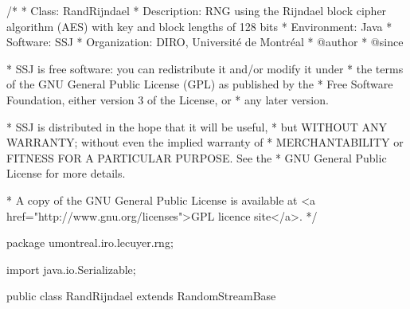 \begin{code}
\begin{hide}
/*
 * Class:        RandRijndael
 * Description:  RNG using the Rijndael block cipher algorithm (AES) with
                 key and block lengths of 128 bits
 * Environment:  Java
 * Software:     SSJ 
 * Organization: DIRO, Université de Montréal
 * @author       
 * @since

 * SSJ is free software: you can redistribute it and/or modify it under
 * the terms of the GNU General Public License (GPL) as published by the
 * Free Software Foundation, either version 3 of the License, or
 * any later version.

 * SSJ is distributed in the hope that it will be useful,
 * but WITHOUT ANY WARRANTY; without even the implied warranty of
 * MERCHANTABILITY or FITNESS FOR A PARTICULAR PURPOSE.  See the
 * GNU General Public License for more details.

 * A copy of the GNU General Public License is available at
   <a href="http://www.gnu.org/licenses">GPL licence site</a>.
 */
\end{hide}
package umontreal.iro.lecuyer.rng; \begin{hide}

import java.io.Serializable; \end{hide}

public class RandRijndael extends RandomStreamBase \begin{hide} {

   private static final long serialVersionUID = 70510L;
   //La date de modification a l'envers, lire 10/05/2007
   

   private static final int BLOCK_SIZE = 16;
   private static final int JUMP_STREAM = 10;
   private static final int JUMP_SUBSTREAM = 5;

   //actually a Object[] containing 2 int[][]
   private static Object key;

   private static byte[] curr_stream;
   private byte[] stream;
   private byte[] substream;

   private byte[] state;
   private byte[] output;
   private int outputPos;

   static
   {
      try {
         key = Rijndael_Algorithm.makeKey(new byte[]{1,2,3,4,5,6,7,8,
                                          9,10,11,12,13,14,15,16},
                                          BLOCK_SIZE);
      } catch(Exception e) {
         //pour que Java soit certain que la clef est initialisee
         key = new Object[0];
         System.exit(1);
      }

      curr_stream = new byte[BLOCK_SIZE];
      for(int i = 0; i < BLOCK_SIZE; i++)
         curr_stream[i] = 0;
   }

   private static void iterate (byte[] b, int pos) {
      while((pos < b.length) && (++b[pos++] == 0));
   }

 \end{hide}
\end{code}

